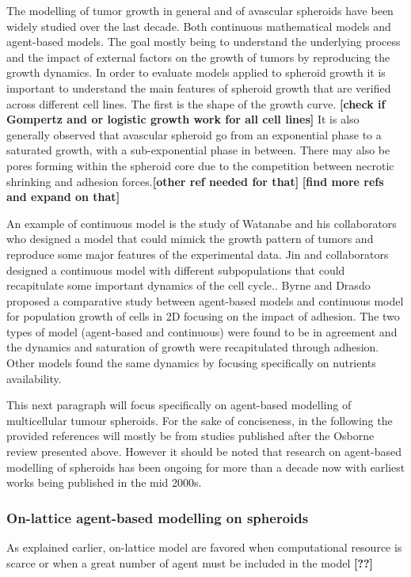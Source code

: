 \documentclass[11pt,a4paper]{article}
\begin{document}
The modelling of tumor growth in general and of avascular spheroids have been widely studied over the last decade. Both continuous mathematical models and agent-based models. The goal mostly being to understand the underlying process and the impact of external factors on the growth of tumors by reproducing the growth dynamics. In order to evaluate models applied to spheroid growth it is important to understand the main features of spheroid growth that are verified across different cell lines. The first is the shape of the growth curve. \textbf{[check if Gompertz and or logistic growth work for all cell lines]} It is also generally observed that avascular spheroid go from an exponential phase to a saturated growth, with a sub-exponential phase in between.\cite{Freyer1988} There may also be pores forming within the spheroid core due to the competition between necrotic shrinking and adhesion forces.\cite{Metzcar2019}\textbf{[other ref needed for that]} \textbf{[find more refs and expand on that]}

An example of continuous model is the study of Watanabe and his collaborators who designed  a model that could mimick the growth pattern of tumors and reproduce some major features of the experimental data.\cite{Watanabe2016} Jin and collaborators designed a continuous model with different subpopulations that could recapitulate some important dynamics of the cell cycle.\cite{Jin2021}. Byrne and Drasdo proposed a comparative study between agent-based models and continuous model for population growth of cells in 2D focusing on the impact of adhesion.\cite{Byrne2008} The two types of model (agent-based and continuous) were found to be in agreement and the dynamics and saturation of growth were recapitulated through adhesion. Other models found the same dynamics by focusing specifically on nutrients availability.

This next paragraph will focus specifically on agent-based modelling of multicellular tumour spheroids. For the sake of conciseness, in the following the provided references will mostly be from studies published after the Osborne review presented above. However it should be noted that research on agent-based modelling of spheroids has been ongoing for more than a decade now with earliest works being published in the mid 2000s.  %

\subsubsection{On-lattice agent-based modelling on spheroids}
As explained earlier, on-lattice model are favored when computational resource is scarce or when a great number of agent must be included in the model \textbf{[??]}
\end{document}
